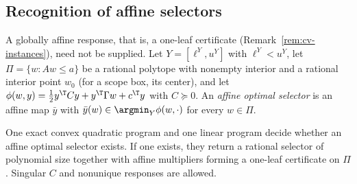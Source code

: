 \subsection{Recognition of affine selectors}

A globally affine response, that is, a one-leaf certificate
(Remark~\ref{rem:cv-instances}), need not be supplied. Let $Y=[\ell^Y,u^Y]$ with
$\ell^Y<u^Y$, let $\Pi=\{w:Aw\le a\}$ be a rational polytope with nonempty
interior and a rational interior point $w_0$ (for a scope box, its center),
and let $\phi(w,y)=\frac12y^{\T}Cy+y^{\T}\Gamma w+c^{\T}y$ with $C\succeq0$.
An \emph{affine optimal selector} is an affine map $\bar y$ with
$\bar y(w)\in\argmin_{Y}\phi(w,\cdot)$ for every $w\in\Pi$.

\begin{theorem}\label{thm:cv-recog}
One exact convex quadratic program and one linear program decide whether an
affine optimal selector exists. If one exists, they return a rational
selector of polynomial size together with affine multipliers forming a
one-leaf certificate on $\Pi$. Singular $C$ and nonunique responses are
allowed.
\end{theorem}

